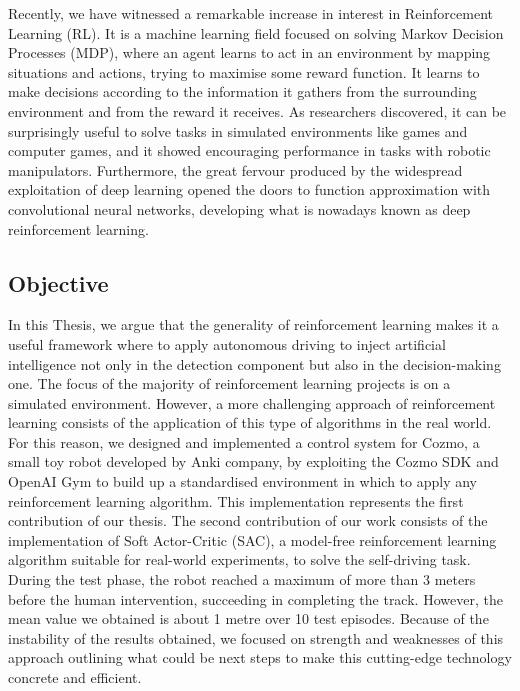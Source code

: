 \documentclass[10pt,twocolumn,letterpaper]{article}
\begin{document}
Recently, we have witnessed a remarkable increase in interest in Reinforcement Learning (RL). It is a machine learning field focused on solving Markov Decision Processes (MDP), where an agent learns to act in an environment by mapping situations and actions, trying to maximise some reward function. It learns to make decisions according to the information it gathers from the surrounding environment and from the reward it receives.
As researchers discovered, it can be surprisingly useful to solve tasks in simulated environments like games and computer games, and it showed encouraging performance in tasks with robotic manipulators. Furthermore, the great fervour produced by the widespread exploitation of deep learning opened the doors to function approximation with convolutional neural networks, developing what is nowadays known as deep reinforcement learning.

\subsection{Objective}

In this Thesis, we argue that the generality of reinforcement learning makes it a useful framework where to apply autonomous driving to inject artificial intelligence not only in the detection component but also in the decision-making one.
The focus of the majority of reinforcement learning projects is on a simulated environment. However, a more challenging approach of reinforcement learning consists of the application of this type of algorithms in the real world.
For this reason, we designed and implemented a control system for Cozmo, a small toy robot developed by Anki company, by exploiting the Cozmo SDK and OpenAI Gym to build up a standardised environment in which to apply any reinforcement learning algorithm. This implementation represents the first contribution of our thesis. The second contribution of our work consists of the implementation of Soft Actor-Critic (SAC), a model-free reinforcement learning algorithm suitable for real-world experiments, to solve the self-driving task. During the test phase, the robot reached a maximum of more than 3 meters before the human intervention, succeeding in completing the track. However, the mean value we obtained is about 1 metre over 10 test episodes. Because of the instability of the results obtained, we focused on strength and weaknesses of this approach outlining what could be next steps to make this cutting-edge technology concrete and efficient.

\end{document}
